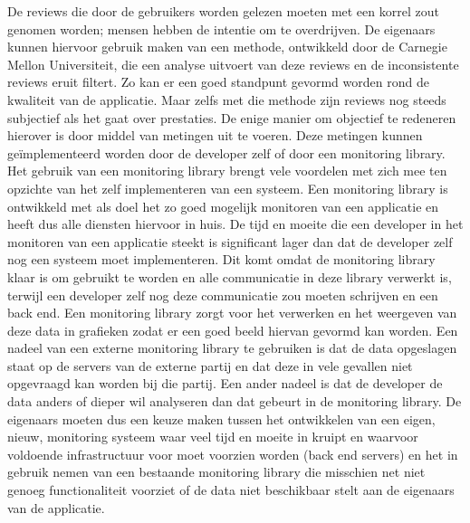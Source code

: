 De reviews die door de gebruikers worden gelezen moeten met een korrel zout genomen worden; mensen hebben de intentie om te overdrijven. De eigenaars kunnen hiervoor gebruik maken van een methode, ontwikkeld door de Carnegie Mellon Universiteit, die een analyse uitvoert van deze reviews en de inconsistente reviews eruit filtert. Zo kan er een goed standpunt gevormd worden rond de kwaliteit van de applicatie. Maar zelfs met die methode zijn reviews nog steeds subjectief als het gaat over prestaties. De enige manier om objectief te redeneren hierover is door middel van metingen uit te voeren. Deze metingen kunnen ge\"implementeerd worden door de developer zelf of door een monitoring library. Het gebruik van een monitoring library brengt vele voordelen met zich mee ten opzichte van het zelf implementeren van een systeem. Een monitoring library is ontwikkeld met als doel het zo goed mogelijk monitoren van een applicatie en heeft dus alle diensten hiervoor in huis. De tijd en moeite die een developer in het monitoren van een applicatie steekt is significant lager dan dat de developer zelf nog een systeem moet implementeren. Dit komt omdat de monitoring library klaar is om gebruikt te worden en alle communicatie in deze library verwerkt is, terwijl een developer zelf nog deze communicatie zou moeten schrijven en een back end. Een monitoring library zorgt voor het verwerken en het weergeven van deze data in grafieken zodat er een goed beeld hiervan gevormd kan worden. Een nadeel van een externe monitoring library te gebruiken is dat de data opgeslagen staat op de servers van de externe partij en dat deze in vele gevallen niet opgevraagd kan worden bij die partij. Een ander nadeel is dat de developer de data anders of dieper wil analyseren dan dat gebeurt in de monitoring library. De eigenaars moeten dus een keuze maken tussen het ontwikkelen van een eigen, nieuw, monitoring systeem waar veel tijd en moeite in kruipt en waarvoor voldoende infrastructuur voor moet voorzien worden (back end servers) en het in gebruik nemen van een bestaande monitoring library die misschien net niet genoeg functionaliteit voorziet of de data niet beschikbaar stelt aan de eigenaars van de applicatie.\\


